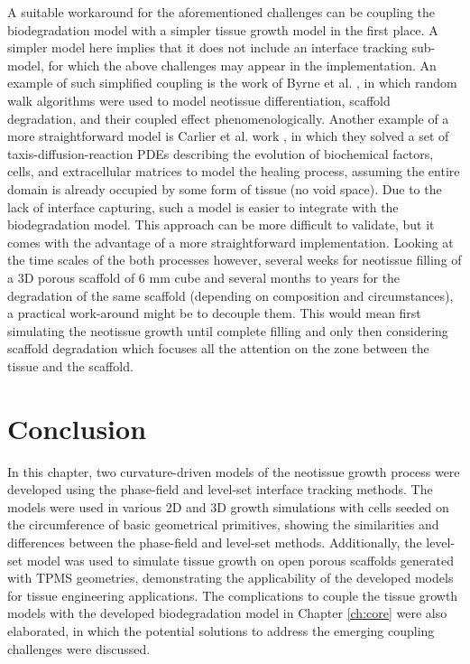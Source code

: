 A suitable workaround for the aforementioned challenges can be coupling the biodegradation model with a simpler tissue growth model in the first place. A simpler model here implies that it does not include an interface tracking sub-model, for which the above challenges may appear in the implementation. An example of such simplified coupling is the work of Byrne et al. \cite{Byrne2007}, in which random walk algorithms were used to model neotissue differentiation, scaffold degradation, and their coupled effect phenomenologically. Another example of a more straightforward model is Carlier et al. work \cite{Carlier2012,Carlier2016}, in which they solved a set of taxis-diffusion-reaction \gls{PDE}s describing the evolution of biochemical factors, cells, and extracellular matrices to model the healing process, assuming the entire domain is already occupied by some form of tissue (no void space). Due to the lack of interface capturing, such a model is easier to integrate with the biodegradation model. This approach can be more difficult to validate, but it comes with the advantage of a more straightforward implementation. Looking at the time scales of the both processes however, several weeks for neotissue filling of a 3D porous scaffold of 6 mm cube and several months to years for the degradation of the same scaffold (depending on composition and circumstances), a practical work-around might be to decouple them. This would mean first simulating the neotissue growth until complete filling and only then considering scaffold degradation which focuses all the attention on the zone between the tissue and the scaffold.

\section{Conclusion}

In this chapter, two curvature-driven models of the neotissue growth process were developed using the phase-field and level-set interface tracking methods. The models were used in various 2D and 3D growth simulations with cells seeded on the circumference of basic geometrical primitives, showing the similarities and differences between the phase-field and level-set methods. Additionally, the level-set model was used to simulate tissue growth on open porous scaffolds generated with TPMS geometries, demonstrating the applicability of the developed models for tissue engineering applications. The complications to couple the tissue growth models with the developed biodegradation model in Chapter \ref{ch:core} were also elaborated, in which the potential solutions to address the emerging coupling challenges were discussed.



